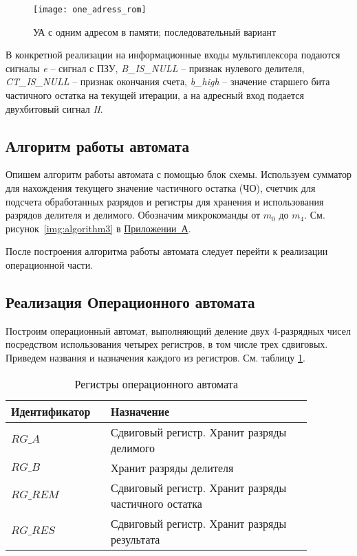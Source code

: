 \documentclass[a4paper,14pt]{extarticle}
\begin{document}
\begin{figure}[h!]
	\begin{center}
		\texttt{[image: one\_adress\_rom]}
		\caption{УА с одним адресом в памяти; последовательный вариант}
		\label{img:scheme3}
	\end{center}	
\end{figure}

В конкретной реализации на информационные входы мультиплексора подаются сигналы \textit{e} -- сигнал с ПЗУ, \textit{B\_IS\_NULL} -- признак нулевого делителя, \textit{CT\_IS\_NULL} -- признак окончания счета, \textit{b\_high} -- значение старшего бита частичного остатка на текущей итерации, а на адресный вход подается двухбитовый сигнал \textit{H}.
\subsection{Алгоритм работы автомата}
Опишем алгоритм работы автомата с помощью блок схемы. Используем сумматор для нахождения текущего значение частичного остатка (ЧО), счетчик для подсчета обработанных разрядов и регистры для хранения и использования разрядов делителя и делимого. Обозначим микрокоманды от $m_0$ до $m_4$. См. рисунок~\ref{img:algorithm3} в \hyperref[tam]{Приложении~А}.

После построения алгоритма работы автомата следует перейти к реализации операционной части.

\subsection {Реализация Операционного автомата}
Построим операционный автомат, выполняющий деление двух 4-разрядных чисел посредством использования четырех регистров, в том числе трех сдвиговых. Приведем названия и назначения каждого из регистров. См. таблицу \ref{tab:regs3}.
\begin{table}[h!]
	\centering
	\begin{tabular}{|m{0.27\linewidth}|m{0.6\linewidth}|}
		\hline
		\textbf{Идентификатор} & \textbf{Назначение} \\ \hline
		$RG\_A$ & Сдвиговый регистр. Хранит разряды делимого \\ \hline
		$RG\_B$ & Хранит разряды делителя \\ \hline
		$RG\_REM$ & Сдвиговый регистр. Хранит разряды частичного остатка \\ \hline
		$RG\_RES$ & Сдвиговый регистр. Хранит разряды результата \\ \hline
	\end{tabular}
	\caption{Регистры операционного автомата}
	\label{tab:regs3}
\end{table}
\end{document}
